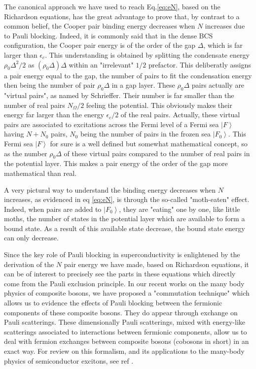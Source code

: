 \documentclass[aps,prb,amsmath,amssymb,preprint,superscriptaddress]{revtex4-1}
\begin{document}
The canonical approach we have used to reach Eq.\eqref{eq:eN}, based on the Richardson equations, has the great advantage to prove that, by contrast to a common belief, the Cooper pair binding energy decreases when $N$ increases due to Pauli blocking.  Indeed, it is commonly said that in the dense BCS configuration, the Cooper pair energy is of the order of the gap $\Delta$, which is far larger than $\epsilon_c$.  This understanding is obtained by splitting the condensate energy $\rho_0\Delta^2/2$ as $(\rho_0\Delta)\Delta$ within an "irrelevant" $1/2$ prefactor. This deliberatly assigns a pair energy equal to the gap, the number of pairs to fit the condensation energy then being the number of pair $\rho_0\Delta$ in a gap layer.  These   $\rho_0\Delta$ pairs actually are "virtual pairs", as named by Schrieffer.  Their number is far smaller than the number of real pairs $N_\Omega/2$ feeling the potential.  This obviously makes their energy far larger than the energy $\epsilon_c
 /2$ of the real pairs.  Actually, these virtual pairs are associated to excitations across the Fermi level of a Fermi sea $\left\vert F\right\rangle$ having $N+N_0$ pairs, $N_0$ being the number of pairs in the frozen sea $\left\vert F_{0}\right\rangle$. This Fermi sea $\left\vert F\right\rangle$ for sure is a well defined but somewhat mathematical concept, so as the number $\rho_0\Delta$ of these virtual pairs compared to the number of real pairs in the potential layer.  This makes a pair energy of the order of the gap more mathematical than real.  

A very pictural  way to understand the binding energy decreases when $N$ increases, as evidenced in eq \eqref{eq:eN}, is through the so-called "moth-eaten" effect. Indeed, when pairs are added to $\left\vert F_{0}\right\rangle$, they are "eating" one by one, like little moths, the number of states in the potential layer which are available to form a bound state.  As a result of this available state decrease, the bound state energy can only decrease.  

Since the key role of Pauli blocking in superconductivity is enlightened   by the derivation of the $N$ pair  energy we have made, based on Richardson equations, it can be of interest to precisely see the parts in these equations which directly come from the Pauli exclusion principle.  In our recent works on the many body  physics of composite bosons, we have proposed a "commutation technique" which allows us to evidence the effects of Pauli blocking between the fermionic components of these composite bosons.  They do appear through exchange on Pauli scatterings.  These dimensionally Pauli scatterings, mixed with energy-like scatterings associated to interactions between fermionic components, allow us to deal with fermion exchanges between composite bosons (cobosons in short) in an exact way.  For review on this formalism, and its applications to the many-body physics of semiconductor excitons, see ref \cite{CobosonPhysicsReports,CobosonCalculation}.
\end{document}
